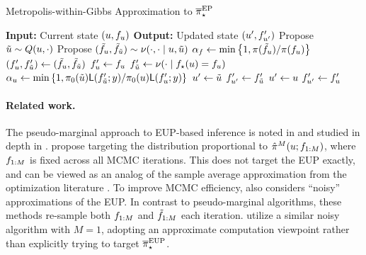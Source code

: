 \documentclass[12pt]{article}
\begin{document}
\begin{algorithm}[H]
    \caption{Metropolis-within-Gibbs Approximation to ${\overline{\pi}}_{\star}^{\mathrm{EP}}$}
    \label{alg:mwg-ep}
    \begin{algorithmic}[1] 
    \State \textbf{Input:} Current state $(u, f_u)$
    \State \textbf{Output:} Updated state $(u^\prime, f^\prime_{u^\prime})$
     \State Propose $\tilde{u} \sim Q(u, \cdot)$
     \State Propose $(\tilde{f}_u, \tilde{f}_{\tilde{u}}) \sim \nu(\cdot, \cdot \mid u, \tilde{u})$ 
     \State $\alpha_{f} \gets \min\left\{1, \pi(\tilde{f}_u) / \pi(f_u) \right\}$
                \State $(f^\prime_u, f^\prime_{\tilde{u}}) \gets (\tilde{f}_u, \tilde{f}_{\tilde{u}})$ 
            \Else
                \State $f^\prime_{u} \gets f_{u}$
                \State $f^\prime_{\tilde{u}} \gets \nu(\cdot \mid {f}_{\star}(u) = f_u)$
            \EndIf
      \State $\alpha_{u} \gets \min\left\{1, \pi_0(\tilde{u} )\mathsf{L}(f^\prime_{\tilde{u}}; y) / \pi_0(u) \mathsf{L}(f^\prime_{u}; y) \right\}$ 
                \State $u^\prime \gets \tilde{u}$
                \State $f^\prime_{u^\prime} \gets f^\prime_{\tilde{u}}$ 
            \Else
            	\State $u^\prime \gets u$
		\State $f^\prime_{u^\prime} \gets f^\prime_{u}$
            \EndIf
    \end{algorithmic}
\end{algorithm}

\paragraph{Related work.}
The pseudo-marginal approach to EUP-based inference is noted in \citep{StuartTeck1} and studied 
in depth in \citep{garegnani2021NoisyMCMC}. \citet{BurknerSurrogate} propose targeting the 
distribution proportional to $\hat{\pi}^M(u; f_{1:M})$, where $f_{1:M}$
is fixed across all MCMC iterations. This does not target the EUP exactly, and can be viewed
as an analog of the sample average approximation from the optimization literature \citep{SAA}.
To improve MCMC efficiency, \citet{garegnani2021NoisyMCMC} also considers ``noisy'' approximations
of the EUP. In contrast to pseudo-marginal algorithms, these methods re-sample both 
$f_{1:M}$ and $\tilde{f}_{1:M}$ each iteration. 
\citet{FerEmulation} utilize a similar noisy algorithm with $M = 1$, adopting an
approximate computation viewpoint rather than explicitly trying to target ${\overline{\pi}}_{\star}^{\mathrm{EUP}}$.
\end{document}
